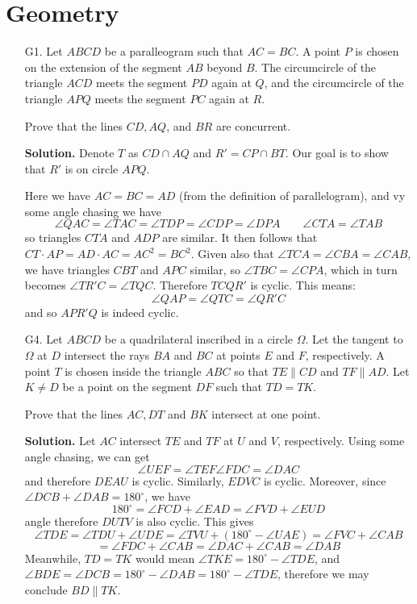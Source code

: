 \documentclass[11pt,a4paper]{article}
\begin{document}
	\section*{Geometry}
	\begin{enumerate}
		\item [G1.]  Let $ABCD$ be a paralleogram such that $AC = BC$. A point $P$ is chosen on the extension of the segment $AB$ beyond $B$. 
		The circumcircle of the triangle $ACD$ meets the segment $PD$ again at $Q$, and the circumcircle of the triangle $APQ$ meets the segment $PC$ again at $R$.
		
		Prove that the lines $CD, AQ$, and $BR$ are concurrent.
		
		\textbf{Solution.} 
		Denote $T$ as $CD\cap AQ$ and $R'=CP\cap BT$. Our goal is to show that $R'$ is on circle $APQ$. 
		 
		Here we have $AC=BC=AD$ (from the definition of parallelogram), and vy some angle chasing we have 
		\[
		\angle QAC = \angle TAC = \angle TDP = \angle CDP = \angle DPA
		\qquad 
		\angle CTA = \angle TAB
		\]
		so triangles $CTA$ and $ADP$ are similar. It then follows that $CT\cdot AP = AD\cdot AC = AC^2=BC^2$. 
		Given also that $\angle TCA = \angle CBA=\angle CAB$, we have triangles $CBT$ and $APC$ similar, so $\angle TBC = \angle CPA$, which in turn becomes 
		$\angle TR'C=\angle TQC$. Therefore $TCQR'$ is cyclic. 
		This means: 
		\[
		\angle QAP = \angle QTC = \angle QR'C
		\]
		and so $APR'Q$ is indeed cyclic. 
		
		\item [G4.] 
		Let $ABCD$ be a quadrilateral inscribed in a circle $\Omega$. 
		Let the tangent to $\Omega$ at $D$ intersect the rays $BA$ and $BC$ at points $E$ and $F$, respectively. 
		A point $T$ is chosen inside the triangle $ABC$ so that $TE \parallel CD$ and $TF \parallel AD$. Let $K \neq D$ be a point on the segment $DF$ such that $TD = TK$.
		
		Prove that the lines $AC, DT$ and $BK$ intersect at one point.
		
		\textbf{Solution.} 
		Let $AC$ intersect $TE$ and $TF$ at $U$ and $V$, respectively. 
		Using some angle chasing, we can get 
		\[
		\angle UEF = \angle TEF \angle FDC = \angle DAC
		\]
		and therefore $DEAU$ is cyclic. Similarly, $EDVC$ is cyclic. 
		Moreover, since $\angle DCB+\angle DAB=180^{\circ}$, 
		we have 
		\[
		180^{\circ}
		=\angle FCD + \angle EAD
		=\angle FVD + \angle EUD
		\]
		angle therefore $DUTV$ is also cyclic. 
		This gives 
		\[
		\angle TDE
		=\angle TDU + \angle UDE
		=\angle TVU + (180^{\circ} - \angle UAE)
		=\angle FVC + \angle CAB
		\]\[
		=\angle FDC + \angle CAB 
		= \angle DAC + \angle CAB
		=\angle DAB
		\]
		Meanwhile, $TD=TK$ would mean $\angle TKE = 180^{\circ} - \angle TDE$, 
		and $\angle BDE=\angle DCB = 180^{\circ} - \angle DAB = 180^{\circ} - \angle TDE$, 
		therefore we may conclude $BD\parallel TK$. 
		

\end{enumerate}
\end{document}
